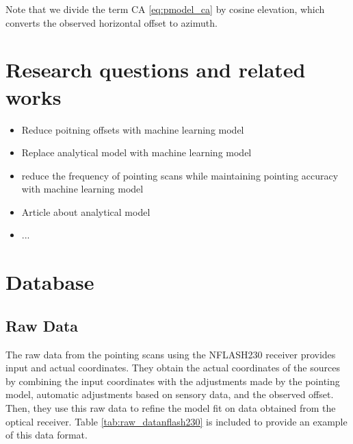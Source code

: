 Note that we divide the term CA \eqref{eq:pmodel_ca} by cosine elevation, which converts the observed horizontal offset to azimuth.

\section{Research questions and related works} \label{sec:research_qs}
\begin{itemize}
    \item Reduce poitning offsets with machine learning model
    \item Replace analytical model with machine learning model
    \item reduce the frequency of pointing scans while maintaining pointing accuracy with machine learning model
\end{itemize}

\begin{itemize}
    \item Article about analytical model
    \item ...
\end{itemize}

\section{Database} \label{sec:database}


\subsection{Raw Data}
The raw data from the pointing scans using the NFLASH230 receiver provides input and actual coordinates.
They obtain the actual coordinates of the sources by combining the input coordinates with the adjustments made by the pointing model,
automatic adjustments based on sensory data, and the observed offset.
Then, they use this raw data to refine the model fit on data obtained from the optical receiver.
Table \ref{tab:raw_datanflash230} is included to provide an example of this data format. 



